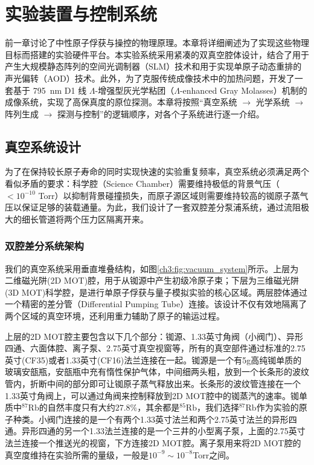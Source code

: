 \documentclass[../main.tex]{subfiles}
\begin{document}

\chapter{实验装置与控制系统}
\label{ch3:sec:setup}

前一章讨论了中性原子俘获与操控的物理原理。本章将详细阐述为了实现这些物理目标而搭建的实验硬件平台。本实验系统采用紧凑的双真空腔体设计，结合了用于产生大规模静态阵列的空间光调制器（SLM）技术和用于实现单原子动态重排的声光偏转（AOD）技术。此外，为了克服传统成像技术中的加热问题，开发了一套基于 \SI{795}{\nm} D1 线 $\Lambda$-增强型灰光学粘团（$\Lambda$-enhanced Gray Molasses）机制的成像系统，实现了高保真度的原位探测。本章将按照“真空系统 $\to$ 光学系统 $\to$ 阵列生成 $\to$ 探测与控制”的逻辑顺序，对各个子系统进行逐一介绍。

\section{真空系统设计}
\label{ch3:sec:vacuum_system}

为了在保持较长原子寿命的同时实现快速的实验重复频率，真空系统必须满足两个看似矛盾的要求：科学腔（Science Chamber）需要维持极低的背景气压（$< 10^{-10}$ Torr）以抑制背景碰撞损失，而原子源区域则需要维持较高的铷原子蒸气压以保证足够的装载通量。为此，我们设计了一套双腔差分泵浦系统，通过流阻极大的细长管道将两个压力区隔离开来。

\subsection{双腔差分系统架构}
\label{ch3:sec:vacuum_architecture}

我们的真空系统采用垂直堆叠结构，如图\ref{ch3:fig:vacuum_system}所示。上层为 二维磁光阱(2D MOT)腔，用于从铷源中产生初级冷原子束；下层为三维磁光阱(3D MOT)科学腔，是进行单原子俘获与量子模拟实验的核心区域。两层腔体通过一个精密的差分管（Differential Pumping Tube）连接。该设计不仅有效地隔离了两个区域的真空环境，还利用重力辅助了原子的输运过程。

上层的2D MOT腔主要包含以下几个部分：铷源、1.33英寸角阀（小阀门）、异形四通、六面体腔、离子泵、2.75英寸真空视窗等，所有的真空部件通过标准的2.75英寸(CF35)或者1.33英寸(CF16)法兰连接在一起。铷源是一个有5g高纯铷单质的玻璃安瓿瓶，安瓿瓶中充有惰性保护气体，中间细两头粗，放到一个长条形的波纹管内，折断中间的部分即可让铷原子蒸气释放出来。长条形的波纹管连接在一个1.33英寸角阀上，可以通过角阀来控制释放到2D MOT腔中的铷蒸汽的速率。铷单质中${}^{87}\mathrm{Rb}$的自然丰度只有大约$27.8\%$，其余都是${}^{85}\mathrm{Rb}$，我们选择${}^{87}\mathrm{Rb}$作为实验的原子种类。小阀门连接的是一个有两个1.33英寸法兰和两个2.75英寸法兰的异形四通。异形四通的另一个1.33法兰连接的是一个三井的小型离子泵，上面的2.75英寸法兰连接一个推送光的视窗，下方连接2D MOT腔。离子泵用来将2D MOT腔的真空度维持在实验所需的量级，一般是$10^{-9}\sim10^{-8}$Torr之间。
\end{document}
